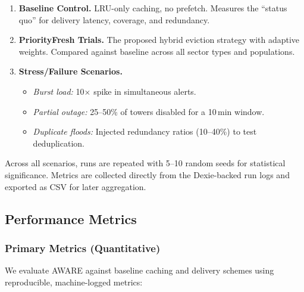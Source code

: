 \documentclass[11pt,twocolumn]{article}
\begin{document}
\begin{enumerate}
    \item \textbf{Baseline Control.} LRU-only caching, no prefetch. Measures the “status quo” for delivery latency, coverage, and redundancy.
    \item \textbf{PriorityFresh Trials.} The proposed hybrid eviction strategy with adaptive weights. Compared against baseline across all sector types and populations.
    \item \textbf{Stress/Failure Scenarios.} 
        \begin{itemize}
            \item \emph{Burst load:} 10$\times$ spike in simultaneous alerts. 
            \item \emph{Partial outage:} 25–50\% of towers disabled for a 10\,min window. 
            \item \emph{Duplicate floods:} Injected redundancy ratios (10–40\%) to test deduplication.
        \end{itemize}
\end{enumerate}

Across all scenarios, runs are repeated with 5–10 random seeds for statistical significance. Metrics are collected directly from the Dexie-backed run logs and exported as CSV for later aggregation.

\subsection{Performance Metrics}

\subsubsection{Primary Metrics (Quantitative)}
We evaluate AWARE against baseline caching and delivery schemes using reproducible, machine-logged metrics:
\end{document}
